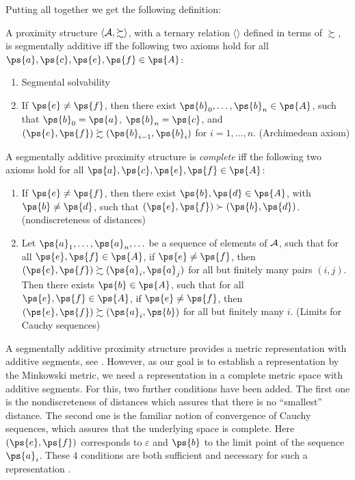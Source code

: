 Putting all together we get the following definition:

\begin{defi}  \label{def-seg-add-ps}
	A proximity structure $\langle \mathcal{A}, \succsim \rangle$, with a ternary relation $\langle \rangle$ defined in terms of $\succsim$, is segmentally additive iff the following two axioms hold for all $\ps{a}, \ps{c}, \ps{e}, \ps{f} \in \ps{A}$:
	\begin{enumerate}
		\item Segmental solvability
		\item If $\ps{e} \neq \ps{f}$, then there exist $\ps{b}_0, \ldots, \ps{b}_n \in \ps{A}$, such that $\ps{b}_0 = \ps{a}$, $\ps{b}_n = \ps{c}$, and $(\ps{e}, \ps{f}) \succsim (\ps{b}_{i-1}, \ps{b}_i)$ for $i = 1, \ldots, n$. (Archimedean axiom)
	\end{enumerate}
	A segmentally additive proximity structure is \emph{complete} iff the following two axioms hold for all $\ps{a}, \ps{c}, \ps{e}, \ps{f} \in \ps{A}$:
	\begin{enumerate}
		\item[3.] If $\ps{e} \neq \ps{f}$, then there exist $\ps{b}, \ps{d} \in \ps{A}$, with $\ps{b} \neq \ps{d}$, such that $(\ps{e}, \ps{f}) \succ (\ps{b}, \ps{d})$. (nondiscreteness of distances)
		\item[4.] Let $\ps{a}_1, \ldots, \ps{a}_n, \ldots$ be a sequence of elements of $\mathcal{A}$, such that for all $\ps{e}, \ps{f} \in \ps{A}$, if $\ps{e} \neq \ps{f}$, then $(\ps{e}, \ps{f}) \succsim (\ps{a}_i, \ps{a}_j)$ for all but finitely many pairs $(i, j)$. Then there exists $\ps{b} \in \ps{A}$, such that for all $\ps{e}, \ps{f} \in \ps{A}$, if $\ps{e} \neq \ps{f}$, then $(\ps{e}, \ps{f}) \succsim (\ps{a}_i, \ps{b})$ for all but finitely many $i$. (Limits for Cauchy sequences)
	\end{enumerate}
\end{defi}

A segmentally additive proximity structure provides a metric representation with additive segments, see \textcite[p. 168]{foundations2}. However, as our goal is to establish a representation by the Minkowski metric, we need a representation in a complete metric space with additive segments.
For this, two further conditions have been added.
The first one is the nondiscreteness of distances which assures that there is no ``smallest'' distance. The second one is the familiar notion of convergence of Cauchy sequences, which assures that the underlying space is complete. Here $(\ps{e}, \ps{f})$ corresponds to $\varepsilon$ and $\ps{b}$ to the limit point of the sequence $\ps{a}_i$.
These 4 conditions are both sufficient and necessary for such a representation \parencite[p. 168]{foundations2}.

